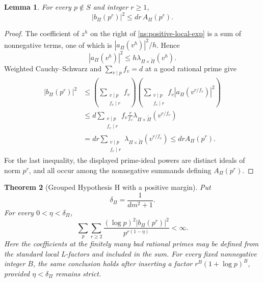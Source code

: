 \documentclass[11pt,reqno]{amsart}
\numberwithin{equation}{section}
\newtheorem{theorem}{Theorem}[section]
\newtheorem{lemma}[theorem]{Lemma}
\theoremstyle{definition}
\theoremstyle{remark}
\begin{document}
\begin{lemma}\label{ns:coefficient-domination}
For every $p\notin S$ and integer $r\ge1$,
\begin{equation}\label{ns:coefficient-bound}
|b_\Pi(p^r)|^2\le dr\,A_\Pi(p^r).
\end{equation}
\end{lemma}
\begin{proof}
The coefficient of $z^h$ on the right of \eqref{ns:positive-local-exp} is a sum of nonnegative terms, one of which is $|a_\Pi(v^h)|^2/h$. Hence
\begin{equation}\label{ns:local-domination}
|a_\Pi(v^h)|^2\le h\lambda_{\Pi\times\widetilde\Pi}(v^h).
\end{equation}
Weighted Cauchy--Schwarz and $\sum_{v\mid p}f_v=d$ at a good rational prime give
\begin{align*}
|b_\Pi(p^r)|^2
&\le\left(\sum_{\substack{v\mid p\\f_v\mid r}}f_v\right)
      \left(\sum_{\substack{v\mid p\\f_v\mid r}}
                   f_v|a_\Pi(v^{r/f_v})|^2\right)\\
&\le d\sum_{\substack{v\mid p\\f_v\mid r}}
     f_v\frac r{f_v}\lambda_{\Pi\times\widetilde\Pi}(v^{r/f_v})\\
&=dr\sum_{\substack{v\mid p\\f_v\mid r}}
      \lambda_{\Pi\times\widetilde\Pi}(v^{r/f_v})
 \le dr A_\Pi(p^r).
\end{align*}
For the last inequality, the displayed prime-ideal powers are distinct ideals of norm $p^r$, and all occur among the nonnegative summands defining $A_\Pi(p^r)$.
\end{proof}

\begin{theorem}[Grouped Hypothesis H with a positive margin]\label{ns:collapsed-h}
Put
\begin{equation}\label{ns:delta-definition}
\delta_\Pi=\frac1{dm^2+1}.
\end{equation}
For every $0<\eta<\delta_\Pi$,
\begin{equation}\label{ns:collapsed-h-bound}
\sum_p\sum_{r\ge2}
\frac{(\log p)^2|b_\Pi(p^r)|^2}{p^{r(1-\eta)}}<\infty.
\end{equation}
Here the coefficients at the finitely many bad rational primes may be defined from the standard local L-factors and included in the sum. For every fixed nonnegative integer $B$, the same conclusion holds after inserting a factor $r^B(1+\log p)^B$, provided $\eta<\delta_\Pi$ remains strict.
\end{theorem}
\end{document}
